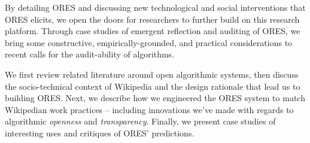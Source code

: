 By detailing ORES and discussing new technological and social interventions that ORES elicits, we open the doors for researchers to further build on this research platform\cite{terveen2014study}.  Through case studies of emergent reflection and auditing of ORES, we bring some constructive, empirically-grounded, and practical considerations to recent calls for the audit-ability of algorithms\cite{sandvig2014auditing}.

We first review related literature around open algorithmic systems, then discuss the socio-technical context of Wikipedia and the design rationale that lead us to building ORES.  Next, we describe how we engineered the ORES system to match Wikipedian work practices -- including innovations we've made with regards to algorithmic \emph{openness} and \emph{transparency}.  Finally, we present case studies of interesting uses and critiques of ORES' predictions.
